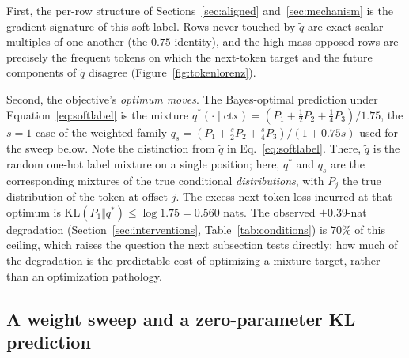 First, the per-row structure of Sections~\ref{sec:aligned} and~\ref{sec:mechanism} is
the gradient signature of this soft label. Rows never touched by $\tilde{q}$ are exact
scalar multiples of one another (the $0.75$ identity), and the high-mass opposed rows
are precisely the frequent tokens on which the next-token target and the future
components of $\tilde{q}$ disagree (Figure~\ref{fig:tokenlorenz}).

Second, the objective's \emph{optimum moves}. The Bayes-optimal prediction under
Equation~\ref{eq:softlabel} is the mixture
$q^{*}(\cdot \mid \mathrm{ctx}) = \left(P_1 + \tfrac{1}{2}P_2 + \tfrac{1}{4}P_3\right)/1.75$,
the $s{=}1$ case of the weighted family
$q_s = \left(P_1 + \tfrac{s}{2}P_2 + \tfrac{s}{4}P_3\right)/(1+0.75s)$ used for the
sweep below. Note the distinction from $\tilde{q}$ in Eq.~\eqref{eq:softlabel}. There, $\tilde{q}$ is the random one-hot label mixture on a single position; here, $q^{*}$ and $q_s$ are the corresponding mixtures of the true conditional \emph{distributions}, with $P_j$ the true distribution of the token at offset $j$. The excess next-token loss incurred at that optimum is $\mathrm{KL}(P_1 \Vert q^{*}) \leq \log 1.75 = 0.560$ nats. The observed $+0.39$-nat degradation (Section~\ref{sec:interventions},
Table~\ref{tab:conditions}) is $70\%$ of this ceiling, which raises the
question the next subsection tests directly: how much of the degradation is the
predictable cost of optimizing a mixture target, rather than an optimization pathology.

\subsection{A weight sweep and a zero-parameter KL prediction}
\label{sec:mixturetest}
